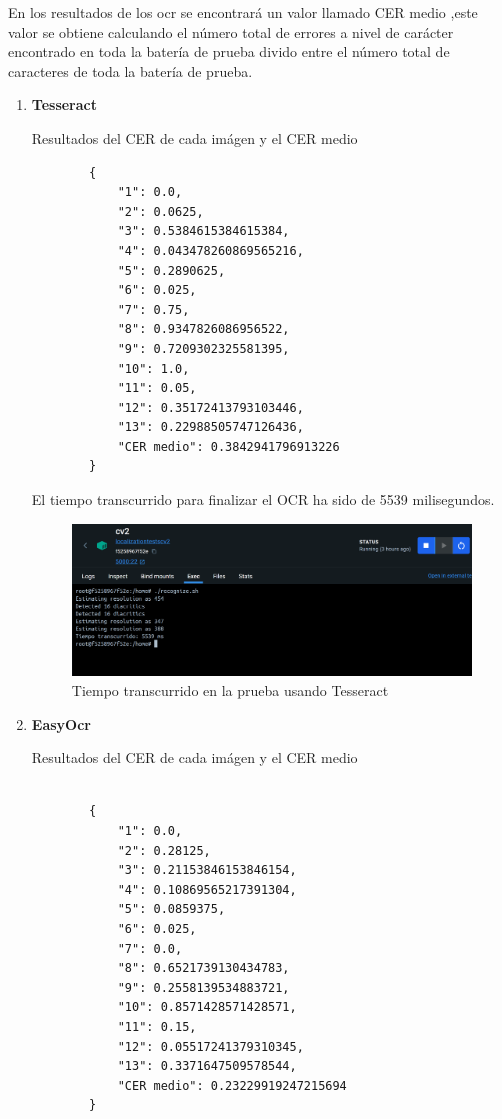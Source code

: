 En los resultados de los ocr se encontrará un valor llamado CER medio ,este valor se obtiene calculando el número total de errores a nivel de carácter encontrado en toda la batería de prueba divido entre el número total de caracteres de toda la batería de prueba.
\begin{enumerate}
	\item \textbf{Tesseract}
	
	
	Resultados del CER de cada imágen y el CER medio
	\begin{verbatim}
		{
			"1": 0.0,
			"2": 0.0625,
			"3": 0.5384615384615384,
			"4": 0.043478260869565216,
			"5": 0.2890625,
			"6": 0.025,
			"7": 0.75,
			"8": 0.9347826086956522,
			"9": 0.7209302325581395,
			"10": 1.0,
			"11": 0.05,
			"12": 0.35172413793103446,
			"13": 0.22988505747126436,
			"CER medio": 0.3842941796913226
		}
	\end{verbatim}
	El tiempo transcurrido para finalizar el OCR ha sido de 5539 milisegundos.
	\begin{figure}[H]
		\centering
		\includegraphics[width = 1\textwidth]{Imagenes/OCR/Tiempo_Tesseract.png}
		\caption{Tiempo transcurrido en la prueba usando Tesseract}
	\end{figure}
	\item \textbf{EasyOcr}
	
	Resultados del CER de cada imágen y el CER medio
	\begin{verbatim}
	
		{
			"1": 0.0,
			"2": 0.28125,
			"3": 0.21153846153846154,
			"4": 0.10869565217391304,
			"5": 0.0859375,
			"6": 0.025,
			"7": 0.0,
			"8": 0.6521739130434783,
			"9": 0.2558139534883721,
			"10": 0.8571428571428571,
			"11": 0.15,
			"12": 0.05517241379310345,
			"13": 0.3371647509578544,
			"CER medio": 0.23229919247215694
		}
	\end{verbatim}
	

\end{enumerate}
